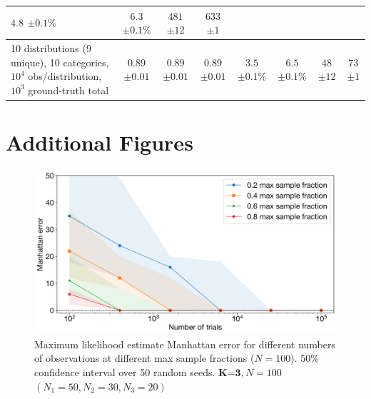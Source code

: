 \documentclass{article}
\theoremstyle{plain}
\theoremstyle{definition}
\theoremstyle{remark}
\begin{document}
\begin{table}[h]
\begin{center}
\begin{scriptsize}
\begin{sc}
\begin{tabular}{l||c|c|c||c|c||c|c}
\makecell{$4.8$\\$\pm 0.1\%$} & \makecell{$6.3$\\$\pm 0.1\%$} & 
\makecell{$481$\\$\pm 12$} & \makecell{$633$\\$\pm 1$} \\
\hline
\makecell{10 distributions (9 unique), 10 categories,\\$10^4$ obs/distribution, $10^3$ ground-truth total} & 
\makecell{$0.89$\\$\pm 0.01$} & \makecell{$0.89$\\$\pm 0.01$} & \makecell{$0.89$\\$\pm 0.01$} & 
\makecell{$3.5$\\$\pm 0.1\%$} & \makecell{$6.5$\\$\pm 0.1\%$} & 
\makecell{$48$\\$\pm 12$} & \makecell{$73$\\$\pm 1$} \\
\hline

\end{tabular}
\end{sc}
\end{scriptsize}
\end{center}
\vskip -0.1in
\end{table}


\section{Additional Figures}
\label{appendix:extra_figs}

\begin{figure}[h]
    \centering
    \includegraphics[width=0.5\linewidth]{scaling_k3_50ci.png}
         \caption{Maximum likelihood estimate Manhattan error for different numbers of observations at different max sample fractions ($N=100$). 50\% confidence interval over 50 random seeds. $\textbf{K=3}, N=100$ $(N_1=50, N_2=30, N_3=20)$}
         \label{fig:scaling_k=3}
\end{figure}
\end{document}
